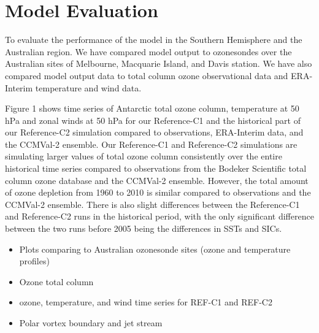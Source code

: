 \section{Model Evaluation}
To evaluate the performance of the model in the Southern Hemisphere and the Australian region. We have compared model output to ozonesondes over the Australian sites of Melbourne, Macquarie Island, and Davis station. We have also compared model output data to total column ozone observational data and ERA-Interim temperature and wind data. 

Figure 1 shows time series of Antarctic total ozone column, temperature at 50 hPa and zonal winds at 50 hPa for our Reference-C1 and the historical part of our Reference-C2 simulation compared to observations, ERA-Interim data, and the CCMVal-2 ensemble. Our Reference-C1 and Reference-C2 simulations are simulating larger values of total ozone column consistently over the entire historical time series compared to observations from the Bodeker Scientific total column ozone database and the CCMVal-2 ensemble. However, the total amount of ozone depletion from 1960 to 2010 is similar compared to observations and the CCMVal-2 ensemble. There is also slight differences between the Reference-C1 and Reference-C2 runs in the historical period, with the only significant difference between the two runs before 2005 being the differences in SSTs and SICs.

\begin{itemize}
\item Plots comparing to Australian ozonesonde sites (ozone and temperature profiles)
\item Ozone total column
\item ozone, temperature, and wind time series for REF-C1 and REF-C2
\item Polar vortex boundary and jet stream
\end{itemize}